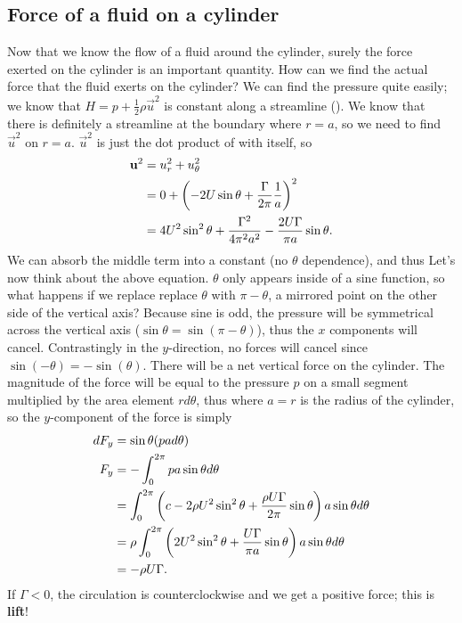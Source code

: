 \documentclass[12pt]{book}
\begin{document}
\subsection{Force of a fluid on a cylinder}
Now that we know the flow of a fluid around the cylinder, surely the force exerted on the cylinder is an important quantity.  How can we find the actual force that the fluid exerts on the cylinder?  We can find the pressure quite easily; we know that $H = p + \frac{1}{2}\rho \vec  u^2$ is constant along a streamline ().  We know that there is definitely a streamline at the boundary where $r=a$, so we need to find $\vec{u}^2$ on $r=a$.  $\vec u ^2$ is just the dot product of \vecu with itself, so
\begin{align}
\vec u ^2 &= u_r^2 + u_{\theta}^2 \notag\\
&= 0 + \left(-2U\sin\theta + \frac{\Gamma}{2\pi}\frac{1}{a}\right)^2 \notag\\
& = 4U^2\sin^2\theta + \frac{\Gamma^2}{4\pi^2a^2} - \frac{2U\Gamma}{\pi a}\sin\theta. \notag \\
\end{align}
We can absorb the middle term into a constant (no $\theta$ dependence), and thus
Let's now think about the above equation. $\theta$ only appears inside of a sine function, so what happens if we replace replace $\theta$ with $\pi - \theta$, a mirrored point on the other side of the vertical axis?  Because sine is odd, the pressure will be symmetrical across the vertical axis ($\sin\theta = \sin(\pi - \theta)$), thus the $x$ components will cancel.  Contrastingly in the $y$-direction, no forces will cancel since $\sin(-\theta) = -\sin(\theta)$. There will be a net vertical force on the cylinder.  The magnitude of the force will be equal to the pressure $p$ on a small segment multiplied by the area element $rd\theta$, thus
where $a=r$ is the radius of the cylinder, so the $y$-component of the force is simply
\begin{align}
dF_y &= \sin\theta(pa d\theta) \\
F_y &= -\int^{2\pi}_{0} pa\sin\theta d\theta \notag\\
& = \int^{2\pi}_{0} \left( c - 2\rho U^2\sin^2\theta + \frac{\rho U \Gamma}{2\pi}\sin\theta\right)a\sin\theta d\theta \notag\\
&=\rho\int^{2\pi}_{0}\left(2U^2\sin^2\theta + \frac{U\Gamma}{\pi a}\sin\theta\right)a\sin\theta d\theta \notag\\
&=-\rho U \Gamma.
\end{align}
If $\Gamma < 0$, the circulation is counterclockwise and we get a positive force; this is \textbf{lift}!
\end{document}
